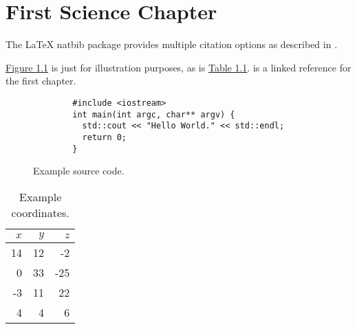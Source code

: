 \chapter{First Science Chapter}
\label{chap:2}

The \LaTeX{} natbib package provides multiple citation options as described in
\citet{natbib:2010}.

\hyperref[fig:2.1]{Figure \ref*{fig:2.1}} is just for illustration purposes,
as is \hyperref[tab:2.1]{Table \ref*{tab:2.1}}.
\hyperref[chap:3]{} is a linked reference for the first chapter.

\begin{figure}[h]
    \begin{verbatim}
        #include <iostream>
        int main(int argc, char** argv) {
          std::cout << "Hello World." << std::endl;
          return 0;
        }
    \end{verbatim}
  \caption{Example source code.}
  \label{fig:2.1}
\end{figure}

\begin{table}[b]
  \centering
  \begin{tabular}{|rr|r|}
    \hline
    $x$ & $y$ & $z$ \\
    \hline
    14 & 12 & -2 \\
    0 & 33 & -25 \\
    -3 & 11 & 22 \\
    4 & 4 & 6 \\
    \hline
  \end{tabular}
  \caption{Example coordinates.}
  \label{tab:2.1}
\end{table}

\ifchapterbib
    
    
\fi

